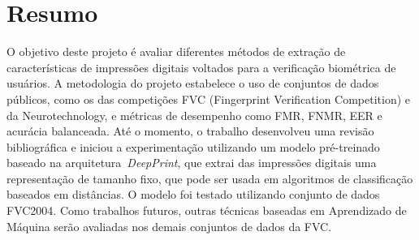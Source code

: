 \section*{Resumo}

 O objetivo deste projeto é avaliar diferentes métodos de extração de características de impressões digitais voltados para a verificação biométrica de usuários. A metodologia do projeto estabelece o uso de conjuntos de dados públicos, como os das competições FVC (Fingerprint Verification Competition) e da Neurotechnology, e métricas de desempenho como FMR, FNMR, EER e acurácia balanceada. Até o momento, o trabalho desenvolveu uma revisão bibliográfica e iniciou a experimentação utilizando um modelo pré-treinado baseado na arquitetura~\textit{DeepPrint}, que extrai das impressões digitais uma representação de tamanho fixo, que pode ser usada em algoritmos de classificação baseados em distâncias. O modelo foi testado utilizando conjunto de dados FVC2004. Como trabalhos futuros, outras técnicas baseadas em Aprendizado de Máquina serão avaliadas nos demais conjuntos de dados da FVC.